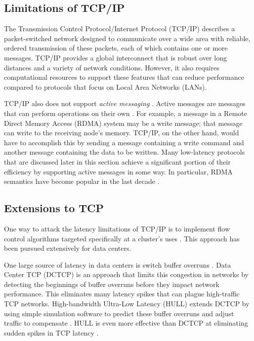 \documentclass[11pt]{book}
\begin{document}
\subsection{Limitations of TCP/IP}

The Transmission Control Protocol/Internet Protocol (TCP/IP) describes a packet-switched
network designed to communicate over a wide area with reliable, ordered transmission of
these packets, each of which contains one or more messages.  TCP/IP provides a global
interconnect that is robust over long distances and a variety of network conditions.
However, it also requires computational resources to support these features that can
reduce performance compared to protocols that focus on Local Area Networks (LANs).

TCP/IP also does not support \textit{active messaging} \cite{liu-94}.  Active messages are
messages that can perform operations on their own \cite{palumbo-92}.  For example, a message in a Remote
Direct Memory Access (RDMA) system may be a write message; that message can write to the
receiving node's memory.  TCP/IP, on the other hand, would have to accomplish this by
sending a message containing a write command and another message containing the data to be
written.  Many low-latency protocols that are discussed later in this section achieve a
significant portion of their efficiency by supporting active messages in some way.  In
particular, RDMA semantics have become popular in the last decade \cite{huang-07}.

\subsection{Extensions to TCP}

One way to attack the latency limitations of TCP/IP is to implement flow control
algorithms targeted specifically at a cluster's uses \cite{liu-13}.  This approach has been
pursued extensively for data centers.

One large source of latency in data centers is switch buffer overruns \cite{liu-13}.  Data
Center TCP (DCTCP) \cite{alizadeh-11} is an approach that limits this congestion in networks by detecting the
beginnings of buffer overruns before they impact network performance.  This eliminates many
latency spikes that can plague high-traffic TCP networks.  High-bandwidth Ultra-Low Latency
(HULL) extends DCTCP by using simple simulation software to predict these buffer overruns
and adjust traffic to compensate \cite{alizadeh-12}. HULL is even more effective than DCTCP at
eliminating sudden spikes in TCP latency \cite{liu-13}.
\end{document}
